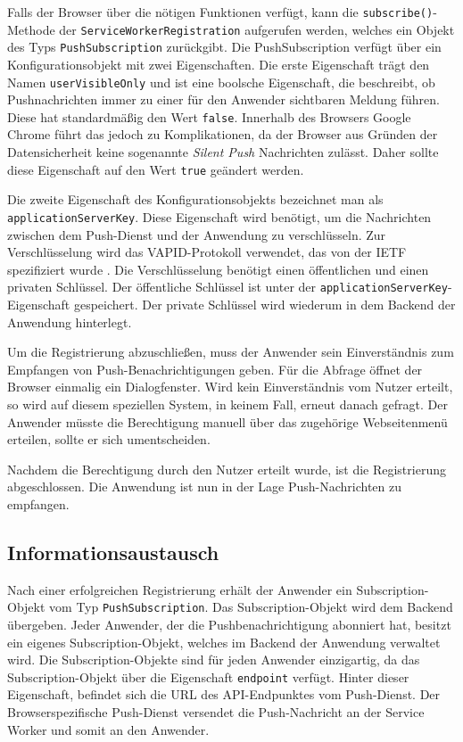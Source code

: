 Falls der Browser über die nötigen Funktionen verfügt, kann die \texttt{subscribe()}-Methode der \texttt{ServiceWorkerRegistration} aufgerufen werden, welches ein Objekt des Typs \texttt{PushSubscription} zurückgibt. 
Die PushSubscription verfügt über ein Konfigurationsobjekt mit zwei Eigenschaften. Die erste Eigenschaft trägt den Namen \texttt{userVisibleOnly} und ist eine boolsche Eigenschaft, die  beschreibt, ob Pushnachrichten immer zu einer für den Anwender sichtbaren Meldung führen. Diese hat standardmäßig den Wert \texttt{false}. Innerhalb des Browsers Google Chrome führt das jedoch zu Komplikationen, da der Browser aus Gründen der Datensicherheit keine sogenannte \textit{Silent Push} Nachrichten zulässt. Daher sollte diese Eigenschaft auf den Wert \texttt{true} geändert werden. 

Die zweite Eigenschaft des Konfigurationsobjekts bezeichnet man als \texttt{applicationServerKey}. Diese Eigenschaft wird benötigt, um die Nachrichten zwischen dem Push-Dienst und der Anwendung zu verschlüsseln. Zur Verschlüsselung wird das \ac{VAPID}-Protokoll verwendet, das von der IETF spezifiziert wurde \cite{rfc8292}. Die Verschlüsselung benötigt einen öffentlichen und einen privaten Schlüssel. Der öffentliche Schlüssel ist unter der \texttt{applicationServerKey}-Eigenschaft gespeichert. Der private Schlüssel wird wiederum in dem Backend der Anwendung hinterlegt. 

Um die Registrierung abzuschließen, muss der Anwender sein Einverständnis zum Empfangen von Push-Benachrichtigungen geben. Für die Abfrage öffnet der Browser einmalig ein Dialogfenster. Wird kein Einverständnis vom Nutzer erteilt, so wird auf diesem speziellen System, in keinem Fall, erneut danach gefragt. Der Anwender müsste die Berechtigung manuell über das zugehörige Webseitenmenü erteilen, sollte er sich umentscheiden. 

Nachdem die Berechtigung durch den Nutzer erteilt wurde, ist die Registrierung abgeschlossen. Die Anwendung ist nun in der Lage Push-Nachrichten zu empfangen. 

\subsection{Informationsaustausch}

Nach einer erfolgreichen Registrierung erhält der Anwender ein Subscription-Objekt vom Typ \texttt{PushSubscription}.
Das Subscription-Objekt wird dem Backend übergeben. Jeder Anwender, der die Pushbenachrichtigung abonniert hat, besitzt ein eigenes Subscription-Objekt, welches im Backend der Anwendung verwaltet wird. 
Die Subscription-Objekte sind für jeden Anwender einzigartig, da das Subscription-Objekt über die Eigenschaft \texttt{endpoint} verfügt. Hinter dieser Eigenschaft, befindet sich die URL des API-Endpunktes vom Push-Dienst. Der Browserspezifische Push-Dienst versendet die Push-Nachricht an der Service Worker und somit an den Anwender. 

